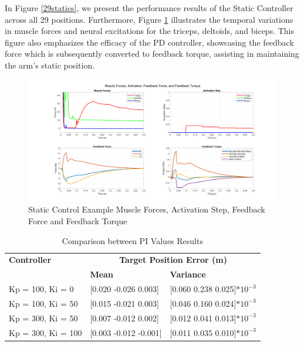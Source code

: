 In Figure \ref{29statics}, we present the performance results of the Static Controller across all 29 positions. Furthermore, Figure \ref{fig:SC} illustrates the temporal variations in muscle forces and neural excitations for the triceps, deltoids, and biceps. This figure also emphasizes the efficacy of the PD controller, showcasing the feedback force which is subsequently converted to feedback torque, assisting in maintaining the arm's static position.

\begin{figure}[h!]
\centering
\includegraphics[width=1\textwidth]{Pictures/Controller/StaticControl.png} 
\caption{Static Control Example Muscle Forces, Activation Step, Feedback Force and Feedback Torque } %
\label{fig:SC} %
\end{figure}

\begin{table}[h]
    \centering
    \tiny %
    \caption{Comparison between PI Values Results}
    \begin{tabularx}{\linewidth}{|X|X|X|}
        \hline
        \textbf{Controller} & \multicolumn{2}{c|}{\textbf{Target Position Error (m)}} \\
        \cline{2-3}
        & \textbf{Mean} & \textbf{Variance} \\
        \hline
        Kp = 100, Ki = 0 & [0.020 -0.026 0.003] & [0.060 0.238 0.025]$*10^{-3}$ \\
        \hline
        Kp = 100, Ki = 50  & [0.015 -0.021 0.003] & [0.046 0.160 0.024]$*10^{-3}$  \\
        \hline
        Kp = 300, Ki = 50 & [0.007 -0.012 0.002] & [0.012 0.041 0.013]$*10^{-3}$  \\
        \hline
        Kp = 300, Ki = 100 & [0.003 -0.012 -0.001] & [0.011 0.035 0.010]$*10^{-3}$  \\
        \hline
    \end{tabularx}
\end{table}


